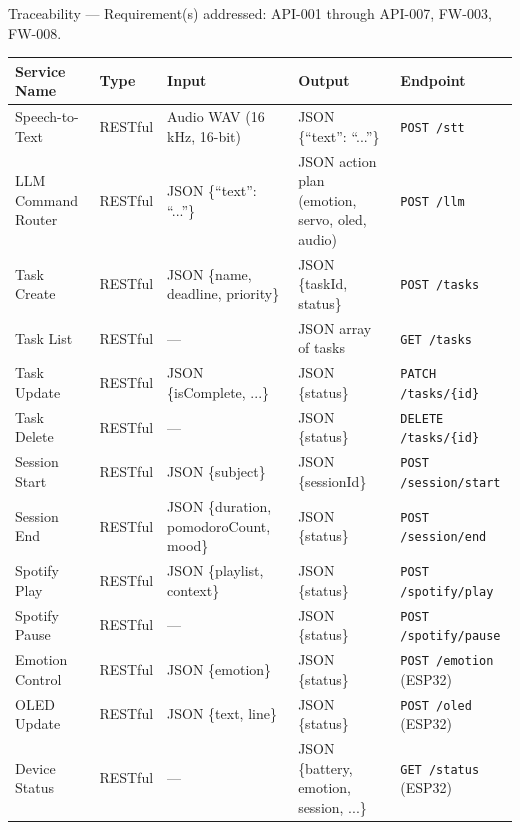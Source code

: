 \documentclass[12pt,a4paper]{article}
\begin{document}
\begin{tracebox}
Traceability --- Requirement(s) addressed: API-001 through API-007,
FW-003, FW-008.
\end{tracebox}

\vspace{0.3cm}

\begin{center}
\label{tab:services}
\scriptsize
\begin{tabular}{|L{0.16\textwidth}|L{0.10\textwidth}|L{0.22\textwidth}|L{0.22\textwidth}|L{0.16\textwidth}|}
\hline
\textbf{Service Name} & \textbf{Type} & \textbf{Input} &
\textbf{Output} & \textbf{Endpoint} \\ \hline
Speech-to-Text & RESTful & Audio WAV (16\,kHz, 16-bit) &
                 JSON \{``text'': ``...''\} &
                 \texttt{POST /stt} \\ \hline
LLM Command Router & RESTful & JSON \{``text'': ``...''\} &
                     JSON action plan (emotion, servo, oled, audio) &
                     \texttt{POST /llm} \\ \hline
Task Create & RESTful & JSON \{name, deadline, priority\} &
             JSON \{taskId, status\} &
             \texttt{POST /tasks} \\ \hline
Task List & RESTful & --- & JSON array of tasks &
           \texttt{GET /tasks} \\ \hline
Task Update & RESTful & JSON \{isComplete, ...\} &
             JSON \{status\} &
             \texttt{PATCH /tasks/\{id\}} \\ \hline
Task Delete & RESTful & --- & JSON \{status\} &
             \texttt{DELETE /tasks/\{id\}} \\ \hline
Session Start & RESTful & JSON \{subject\} &
               JSON \{sessionId\} &
               \texttt{POST /session/start} \\ \hline
Session End & RESTful & JSON \{duration, pomodoroCount, mood\} &
             JSON \{status\} &
             \texttt{POST /session/end} \\ \hline
Spotify Play & RESTful & JSON \{playlist, context\} &
              JSON \{status\} &
              \texttt{POST /spotify/play} \\ \hline
Spotify Pause & RESTful & --- & JSON \{status\} &
               \texttt{POST /spotify/pause} \\ \hline
Emotion Control & RESTful & JSON \{emotion\} &
                 JSON \{status\} &
                 \texttt{POST /emotion} (ESP32) \\ \hline
OLED Update & RESTful & JSON \{text, line\} &
             JSON \{status\} &
             \texttt{POST /oled} (ESP32) \\ \hline
Device Status & RESTful & --- &
               JSON \{battery, emotion, session, ...\} &
               \texttt{GET /status} (ESP32) \\ \hline
\end{tabular}
\end{center}
\end{document}
